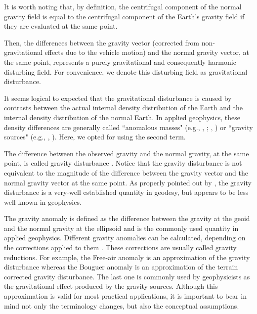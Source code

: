 \documentclass[paper,twocolumn,twoside]{geophysics}
\begin{document}
It is worth noting that, by definition, 
the centrifugal component of the normal gravity field is
equal to the centrifugal component of the Earth's gravity
field if they are evaluated at the same point.


Then, the differences between the gravity vector
(corrected from non-gravitational effects due to the vehicle motion) 
and the normal gravity vector, at the same point, represents a purely 
gravitational and consequently harmonic disturbing field.
For convenience, we denote this disturbing field as
gravitational disturbance.


It seems logical to expected that the gravitational disturbance 
is caused by contrasts between the actual internal 
density distribution of the Earth and the internal density 
distribution of the normal Earth.
In applied geophysics, these density differences are generally 
called ``anomalous masses" (e.g., \citeauthor{hammer1945}, 
\citeyear{hammer1945}; \citeauthor{lafehr1965}, \citeyear{lafehr1965})
or ``gravity sources" (e.g., \citeauthor{blakely1996}, 
\citeyear{blakely1996}). Here, we opted for using the second term.


The difference between the observed gravity and the
normal gravity, at the same point, is called gravity disturbance
\citep{hofmann-wellenhof-moritz2005}.
Notice that the gravity disturbance is not equivalent to the
magnitude of the difference between the gravity vector
and the normal gravity vector at the same point.
As properly pointed out by \citet{hackney-featherstone2003},
the gravity disturbance is a very-well established quantity in geodesy,
but appears to be less well known in geophysics.


The gravity anomaly is defined as the difference
between the gravity at the geoid and the normal gravity at the ellipsoid
and is the commonly used quantity in applied geophysics.
Different gravity anomalies can be calculated, depending on the
corrections applied to them \citep{blakely1996, hofmann-wellenhof-moritz2005}.
These corrections are usually called gravity reductions.
For example, the Free-air anomaly is an approximation of the
gravity disturbance whereas the Bouguer anomaly
is an approximation of the terrain corrected gravity disturbance.
The last one is commonly used by geophysicists as the
gravitational effect produced by the gravity sources.
Although this approximation is valid for most practical applications,
it is important to bear in mind not only the terminology 
changes, but also the conceptual assumptions.
\end{document}

